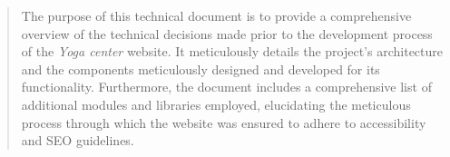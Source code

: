 \begin{abstract}


The purpose of this technical document is to provide a comprehensive overview of the technical decisions made prior to
the development process of the \textit{Yoga center} website. It meticulously details the project’s architecture and
the components meticulously designed and developed for its functionality. Furthermore, the document includes a comprehensive
list of additional modules and libraries employed, elucidating the meticulous process through which the website
was ensured to adhere to accessibility and SEO guidelines.

\end{abstract}

